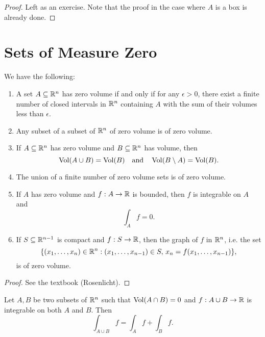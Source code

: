 \begin{proof}
  Left as an exercise. Note that the proof in the case
  where $A$ is a box is already done.
\end{proof}

\section{Sets of Measure Zero}

\begin{prop}
  We have the following:
  \begin{enumerate}
    \item A set $A \subseteq \mathbb{R}^n$ has zero volume if and
      only if
      for any $\epsilon > 0$, there exist a finite number
      of closed intervals in $\mathbb{R}^n$ containing $A$ with
      the sum of their volumes less than $\epsilon$.
    \item Any subset of a subset of $\mathbb{R}^n$ of zero volume
      is of zero volume.
    \item If $A \subseteq \mathbb{R}^n$ has zero volume and
      $B \subseteq \mathbb{R}^n$ has volume, then
      \[
        \operatorname{Vol}(A \cup B) = \operatorname{Vol}(B)
        \quad \text{and} \quad
        \operatorname{Vol}(B \setminus A) = \operatorname{Vol}(B).
      \]
    \item The union of a finite number of zero volume
      sets is of zero volume.
    \item If $A$ has zero volume and $f : A \to \mathbb{R}$ is
      bounded, then $f$ is integrable on $A$ and
      \[
        \int_A f = 0
      .\]
    \item If $S \subseteq \mathbb{R}^{n - 1}$ is compact and
      $f : S \to \mathbb{R}$, then the graph of $f$ in
      $\mathbb{R}^n$, i.e. the set
      \[
        \{(x_1, \dots, x_n) \in \mathbb{R}^n : (x_1, \dots, x_{n - 1}) \in S,\, x_n = f(x_1, \dots, x_{n - 1})\},
      \]
      is of zero volume.
  \end{enumerate}
\end{prop}

\begin{proof}
  See the textbook (Rosenlicht).
\end{proof}

\begin{prop}
  Let $A, B$ be two subsets of $\mathbb{R}^n$ such that
  $\operatorname{Vol}(A \cap B) = 0$ and $f : A \cup B \to \mathbb{R}$ is
  integrable on both $A$ and $B$. Then
  \[
    \int_{A \cup B} f = \int_A f + \int_B f.
  \]
\end{prop}

